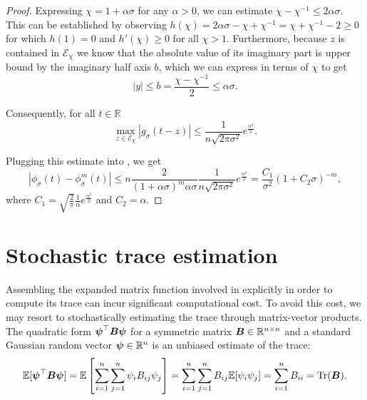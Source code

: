 \begin{proof}
    Expressing $\chi = 1 + \alpha \sigma$ for any $\alpha > 0$,
    we can estimate $\chi - \chi^{-1} \leq 2\alpha\sigma$.
    This can be established by observing
    $h(\chi) = 2\alpha\sigma - \chi + \chi^{-1} = \chi + \chi^{-1} - 2 \geq 0$
    for which $h(1) = 0$ and $h'(\chi) \geq 0$ for all $\chi > 1$.
    Furthermore, because $z$ is
    contained in $\mathcal{E}_{\chi}$ we know that the absolute value of its
    imaginary part is upper bound by the imaginary half axis $b$, which we can
    express in terms of $\chi$ to get 
    \begin{equation}
        |y| \leq b = \frac{\chi - \chi^{-1}}{2} \leq \alpha\sigma.
    \end{equation}

    Consequently, for all $t \in \mathbb{R}$
    \begin{equation}
        \max_{z \in \mathcal{E}_{\chi}} |g_{\sigma}(t - z)| 
        \leq \frac{1}{n \sqrt{2 \pi \sigma^2}} e^{\frac{\alpha^2}{2}}.
    \end{equation}

    Plugging this estimate into , we get
    \begin{equation}
        \left| \phi_{\sigma}(t) - \phi_{\sigma}^m(t) \right|
        \leq n \frac{2}{(1 + \alpha\sigma)^m\alpha \sigma} \frac{1}{n \sqrt{2 \pi \sigma^2}} e^{\frac{\alpha^2}{2}}
        = \frac{C_1}{\sigma^2} (1 + C_2 \sigma)^{-m},
    \end{equation}
    where $C_1=\sqrt{\frac{2}{\pi}}\frac{1}{\alpha}e^{\frac{\alpha^2}{2}}$ and $C_2=\alpha$.
\end{proof}


\section{Stochastic trace estimation}
\label{sec:2-chebyshev-stochastic-trace-estimation}

Assembling the expanded matrix function involved in 
explicitly in order to compute its trace can incur significant computational cost.
To avoid this cost, we may resort to stochastically estimating the trace through
matrix-vector products. The quadratic form $\boldsymbol{\psi}^{\top} \boldsymbol{B} \boldsymbol{\psi}$
for a symmetric matrix $\boldsymbol{B} \in \mathbb{R}^{n \times n}$ and a standard Gaussian
random vector $\boldsymbol{\psi} \in \mathbb{R}^n$ %
is an unbiased estimate of the trace:
\begin{equation}
    \mathbb{E}[\boldsymbol{\psi}^{\top} \boldsymbol{B} \boldsymbol{\psi}]
        = \mathbb{E}\left[\sum_{i=1}^n\sum_{j=1}^n \psi_i B_{ij} \psi_j\right]
        = \sum_{i=1}^n\sum_{j=1}^n B_{ij} \mathbb{E}[\psi_i\psi_j]
        = \sum_{i=1}^n B_{ii}
        = \operatorname{Tr}(\boldsymbol{B}).
    \label{equ:2-chebyshev-DGC-hutchinson}
\end{equation}

